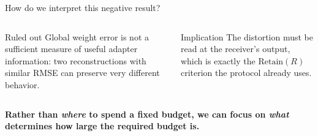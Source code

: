 \documentclass[aspectratio=169,10pt]{beamer}
\begin{document}
\begin{frame}{How do we interpret this negative result?}
\begin{columns}[T,onlytextwidth]
\begin{block}{Ruled out}
\small Global weight error is not a sufficient measure of useful adapter information: two reconstructions with similar RMSE can preserve very different behavior.
\end{block}
\begin{block}{Implication}
\small The distortion must be read at the receiver's output, which is exactly the $\mathrm{Retain}(R)$ criterion the protocol already uses.
\end{block}
\end{columns}
\vfill
\begin{center}\begin{minipage}{0.88\textwidth}\centering\bfseries
  Rather than \emph{where} to spend a fixed budget, we can focus on \emph{what} determines how large the required budget is.
\end{minipage}\end{center}
\end{frame}
\end{document}
